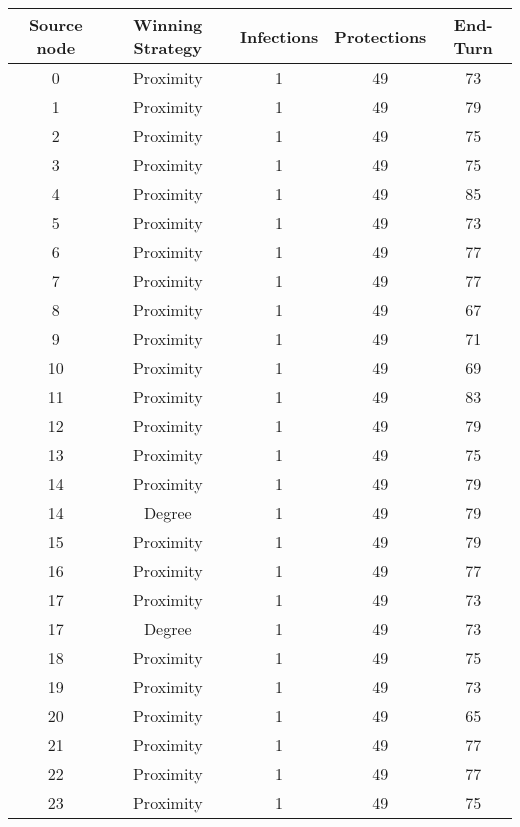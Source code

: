 \documentclass[results.tex]{subfiles}
\begin{document}
\begin{center}
  \begin{tabular}{| c || c | c | c | c |}
    \hline
    {\bfseries Source node} & {\bfseries Winning Strategy} & {\bfseries Infections} & {\bfseries Protections} & {\bfseries End-Turn} \\  %
    \hline\hline
    0 & Proximity & 1 & 49 & 73 \\ 
    \hline
    1 & Proximity & 1 & 49 & 79 \\ 
    \hline
    2 & Proximity & 1 & 49 & 75 \\ 
    \hline
    3 & Proximity & 1 & 49 & 75 \\ 
    \hline
    4 & Proximity & 1 & 49 & 85 \\ 
    \hline
    5 & Proximity & 1 & 49 & 73 \\ 
    \hline
    6 & Proximity & 1 & 49 & 77 \\ 
    \hline
    7 & Proximity & 1 & 49 & 77 \\ 
    \hline
    8 & Proximity & 1 & 49 & 67 \\ 
    \hline
    9 & Proximity & 1 & 49 & 71 \\ 
    \hline
    10 & Proximity & 1 & 49 & 69 \\ 
    \hline
    11 & Proximity & 1 & 49 & 83 \\ 
    \hline
    12 & Proximity & 1 & 49 & 79 \\ 
    \hline
    13 & Proximity & 1 & 49 & 75 \\ 
    \hline
    14 & Proximity & 1 & 49 & 79 \\ 
    \hline
    14 & Degree & 1 & 49 & 79 \\ 
    \hline
    15 & Proximity & 1 & 49 & 79 \\ 
    \hline
    16 & Proximity & 1 & 49 & 77 \\ 
    \hline
    17 & Proximity & 1 & 49 & 73 \\ 
    \hline
    17 & Degree & 1 & 49 & 73 \\ 
    \hline
    18 & Proximity & 1 & 49 & 75 \\ 
    \hline
    19 & Proximity & 1 & 49 & 73 \\ 
    \hline
    20 & Proximity & 1 & 49 & 65 \\ 
    \hline
    21 & Proximity & 1 & 49 & 77 \\ 
    \hline
    22 & Proximity & 1 & 49 & 77 \\ 
    \hline
    23 & Proximity & 1 & 49 & 75 \\ 

\end{tabular}
\end{center}
\end{document}
